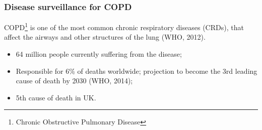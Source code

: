 \documentclass[slidestop,compress,serif,10pt]{beamer}
\begin{document}
\begin{frame}\frametitle{Disease surveillance for COPD}
 \begin{block}{}
COPD\footnote{Chronic Obstructive Pulmonary Disease}  is one of the most common chronic respiratory diseases (CRDs), that affect the airways and other structures of the lung (WHO, 2012).
\end{block}

\begin{itemize}
\vfill\item 64 million people currently suffering from the disease;
\vfill\item Responsible for 6\% of deaths worldwide; projection to become the 3rd leading cause of death by 2030 (WHO, 2014);
\vfill\item 5th cause of death in UK.
\end{itemize}

\end{frame}
%
%
%
%
\end{document}
